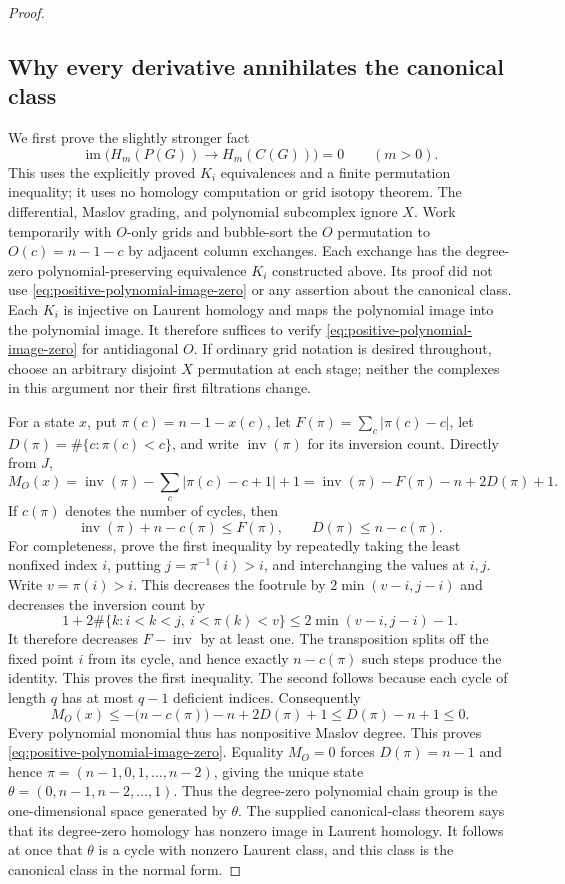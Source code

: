 \documentclass[11pt,a4paper]{article}
\theoremstyle{remark}
\begin{document}
\begin{proof}
\subsection{Why every derivative annihilates the canonical class}

We first prove the slightly stronger fact
\begin{equation}\label{eq:positive-polynomial-image-zero}
 \operatorname{im}\bigl(H_m(P(G))\longrightarrow H_m(C(G))\bigr)=0
 \qquad(m>0).
\end{equation}
This uses the explicitly proved $K_i$ equivalences and a finite
permutation inequality; it uses no homology computation or grid isotopy
theorem.  The differential, Maslov grading, and polynomial subcomplex
ignore $X$.  Work temporarily with $O$-only grids and bubble-sort the
$O$ permutation to $O(c)=n-1-c$ by adjacent column exchanges.  Each
exchange has the degree-zero polynomial-preserving equivalence $K_i$
constructed above.  Its proof did not use
\eqref{eq:positive-polynomial-image-zero} or any assertion about the
canonical class.  Each $K_i$ is injective on Laurent homology and maps
the polynomial image into the polynomial image.  It therefore suffices
to verify \eqref{eq:positive-polynomial-image-zero} for antidiagonal $O$.
If ordinary grid notation is desired throughout, choose an arbitrary
disjoint $X$ permutation at each stage; neither the complexes in this
argument nor their first filtrations change.

For a state $x$, put $\pi(c)=n-1-x(c)$, let
$F(\pi)=\sum_c|\pi(c)-c|$, let $D(\pi)=\#\{c:\pi(c)<c\}$, and write
$\operatorname{inv}(\pi)$ for its inversion count.  Directly from $J$,
\[
 M_O(x)=\operatorname{inv}(\pi)-\sum_c|\pi(c)-c+1|+1
        =\operatorname{inv}(\pi)-F(\pi)-n+2D(\pi)+1.
\]
If $c(\pi)$ denotes the number of cycles, then
\[
 \operatorname{inv}(\pi)+n-c(\pi)\le F(\pi),
 \qquad D(\pi)\le n-c(\pi).
\]
For completeness, prove the first inequality by repeatedly taking the
least nonfixed index $i$, putting $j=\pi^{-1}(i)>i$, and interchanging
the values at $i,j$.  Write $v=\pi(i)>i$.  This decreases the footrule
by $2\min(v-i,j-i)$ and decreases the inversion count by
\[
 1+2\#\{k:i<k<j,\ i<\pi(k)<v\}
 \le 2\min(v-i,j-i)-1.
\]
It therefore decreases $F-\operatorname{inv}$ by at least one.  The
transposition splits off the fixed point $i$ from its cycle, and hence
exactly $n-c(\pi)$ such steps produce the identity.  This proves the
first inequality.  The second follows because each cycle of length
$q$ has at most $q-1$ deficient indices.  Consequently
\[
 M_O(x)\le -\bigl(n-c(\pi)\bigr)-n+2D(\pi)+1
          \le D(\pi)-n+1\le0.
\]
Every polynomial monomial thus has nonpositive Maslov degree.  This
proves \eqref{eq:positive-polynomial-image-zero}.  Equality $M_O=0$ forces
$D(\pi)=n-1$ and hence
$\pi=(n-1,0,1,\ldots,n-2)$, giving the unique state
$\theta=(0,n-1,n-2,\ldots,1)$.  Thus the degree-zero polynomial
chain group is the one-dimensional space generated by $\theta$.
The supplied canonical-class theorem says that its degree-zero
homology has nonzero image in Laurent homology.  It follows at once
that $\theta$ is a cycle with nonzero Laurent class, and this class is
the canonical class in the normal form.


\end{proof}
\end{document}
